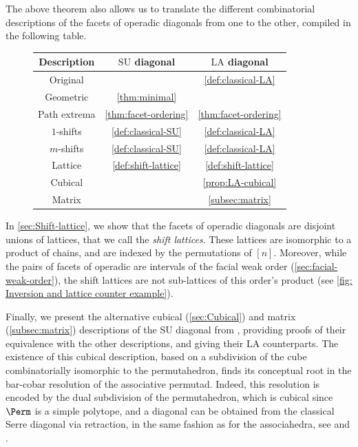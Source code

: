 \documentclass{amsart}
\theoremstyle{definition}
\newcommand{\SU}{\mathrm{SU}}
\newcommand{\LA}{\mathrm{LA}}
\begin{document}
The above theorem also allows us to translate the different combinatorial descriptions of the facets of operadic diagonals from one to the other, compiled in the following table. 

\begin{figure}[h!]
	\begin{center}
	\begin{tabular}{c|c|c}
	Description & $\SU$ diagonal & $\LA$ diagonal \\
	\hline
	Original & \cite{SaneblidzeUmble} & \cref{def:classical-LA} \\
	Geometric & \cref{thm:minimal} & \cite{LaplanteAnfossi} \\
	Path extrema & \cref{thm:facet-ordering} & \cref{thm:facet-ordering} \\
	$1$-shifts & \cref{def:classical-SU} & \cref{def:classical-LA} \\
	$m$-shifts & \cref{def:classical-SU} & \cref{def:classical-LA} \\
	Lattice & \cref{def:shift-lattice} & \cref{def:shift-lattice} \\
	Cubical & \cite{SaneblidzeUmble} & \cref{prop:LA-cubical} \\
	Matrix & \cite{SaneblidzeUmble} & \cref{subsec:matrix} 
	\end{tabular}
	\end{center}
\end{figure}

In \cref{sec:Shift-lattice}, we show that the facets of operadic diagonals are disjoint unions of lattices, that we call the \emph{shift lattices}.
These lattices are isomorphic to a product of chains, and are indexed by the permutations of $[n]$.
Moreover, while the pairs of facets of operadic are intervals of the facial weak order (\cref{sec:facial-weak-order}), the shift lattices are not sub-lattices of this order's product (see \cref{fig: Inversion and lattice counter example}). 

Finally, we present the alternative cubical (\cref{sec:Cubical}) and matrix (\cref{subsec:matrix}) descriptions of the $\SU$ diagonal from \cite{SaneblidzeUmble,SaneblidzeUmble-comparingDiagonals}, providing proofs of their equivalence with the other descriptions, and giving their $\LA$ counterparts. 
The existence of this cubical description, based on a subdivision of the cube combinatorially isomorphic to the permutahedron, finds its conceptual root in the bar-cobar resolution of the associative permutad. 
Indeed, this resolution is encoded by the dual subdivision of the permutahedron, which is cubical since $\Perm$ is a simple polytope, and a diagonal can be obtained from the classical Serre diagonal via retraction, in the same fashion as for the associahedra, see \cite{MarklShnider,Loday} and \cite[Sec. 5.1]{LaplanteAnfossiMazuir}.
\end{document}
